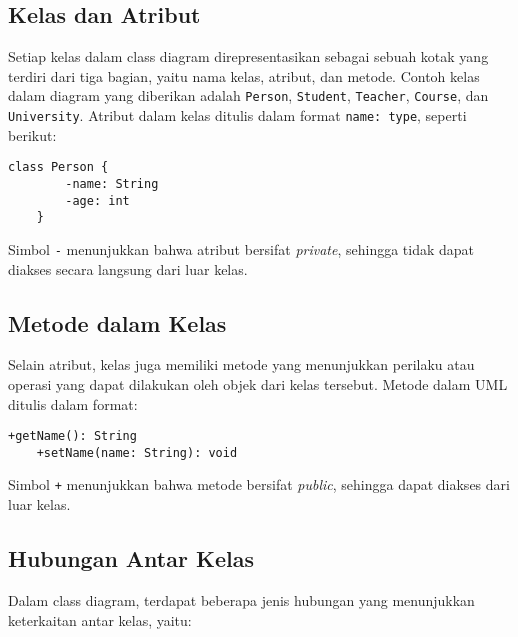 \subsection{Kelas dan Atribut}
Setiap kelas dalam class diagram direpresentasikan sebagai sebuah kotak yang terdiri dari tiga bagian, yaitu nama kelas, atribut, dan metode. Contoh kelas dalam diagram yang diberikan adalah \texttt{Person}, \texttt{Student}, \texttt{Teacher}, \texttt{Course}, dan \texttt{University}. Atribut dalam kelas ditulis dalam format \texttt{name: type}, seperti berikut:
\begin{lstlisting}[language=puml]
	class Person {
		-name: String
		-age: int
	}
\end{lstlisting}
Simbol \texttt{-} menunjukkan bahwa atribut bersifat \textit{private}, sehingga tidak dapat diakses secara langsung dari luar kelas.

\subsection{Metode dalam Kelas}
Selain atribut, kelas juga memiliki metode yang menunjukkan perilaku atau operasi yang dapat dilakukan oleh objek dari kelas tersebut. Metode dalam UML ditulis dalam format:
\begin{lstlisting}[language=puml]
	+getName(): String
	+setName(name: String): void
\end{lstlisting}
Simbol \texttt{+} menunjukkan bahwa metode bersifat \textit{public}, sehingga dapat diakses dari luar kelas.

\subsection{Hubungan Antar Kelas}
Dalam class diagram, terdapat beberapa jenis hubungan yang menunjukkan keterkaitan antar kelas, yaitu:

